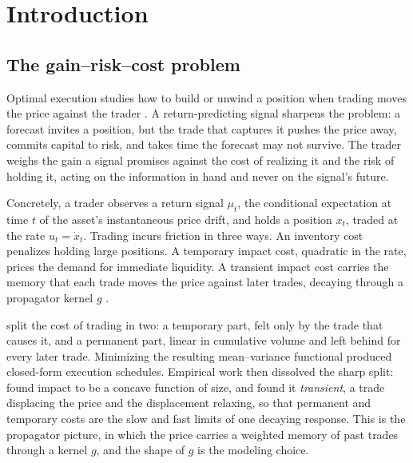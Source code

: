 \documentclass[11pt]{article}
\theoremstyle{plain}
\theoremstyle{definition}
\theoremstyle{remark}
\begin{document}
\section{Introduction}\label{sec:intro}

\subsection{The gain--risk--cost problem}\label{sec:problem}

Optimal execution studies how to build or unwind a position when trading moves the price against the trader \citep{AlmgrenChriss2001,GatheralSchiedSlynko2012}. A return-predicting signal sharpens the problem: a forecast invites a position, but the trade that captures it pushes the price away, commits capital to risk, and takes time the forecast may not survive. The trader weighs the gain a signal promises against the cost of realizing it and the risk of holding it, acting on the information in hand and never on the signal's future.

Concretely, a trader observes a return signal $\mu_t$, the conditional expectation at time $t$ of the asset's instantaneous price drift, and holds a position $x_t$, traded at the rate $u_t=\dot x_t$. Trading incurs friction in three ways. An inventory cost penalizes holding large positions. A temporary impact cost, quadratic in the rate, prices the demand for immediate liquidity. A transient impact cost carries the memory that each trade moves the price against later trades, decaying through a propagator kernel $g$ \citep{BouchaudGefenPottersWyart2004,Gatheral2010}.

\citet{AlmgrenChriss2001} split the cost of trading in two: a temporary part, felt only by the trade that causes it, and a permanent part, linear in cumulative volume and left behind for every later trade. Minimizing the resulting mean--variance functional produced closed-form execution schedules. Empirical work then dissolved the sharp split: \citet{LilloFarmerMantegna2003} found impact to be a concave function of size, and \citet{BouchaudGefenPottersWyart2004} found it \emph{transient}, a trade displacing the price and the displacement relaxing, so that permanent and temporary costs are the slow and fast limits of one decaying response. This is the propagator picture, in which the price carries a weighted memory of past trades through a kernel $g$, and the shape of $g$ is the modeling choice.
\end{document}
